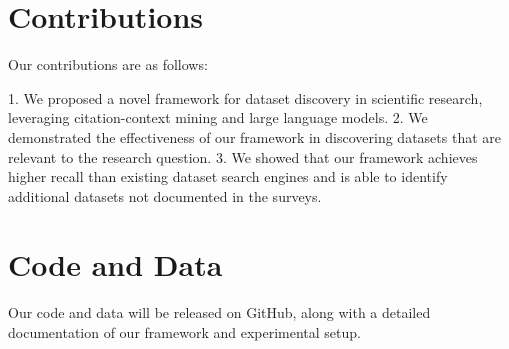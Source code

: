 \documentclass{article}
\begin{document}
        \section{Contributions}

        Our contributions are as follows:

        1. We proposed a novel framework for dataset discovery in scientific research, leveraging citation-context mining and large language models.
        2. We demonstrated the effectiveness of our framework in discovering datasets that are relevant to the research question.
        3. We showed that our framework achieves higher recall than existing dataset search engines and is able to identify additional datasets not documented in the surveys.

        \section{Code and Data}

        Our code and data will be released on GitHub, along with a detailed documentation of our framework and experimental setup.

        
        

        
\end{document}
